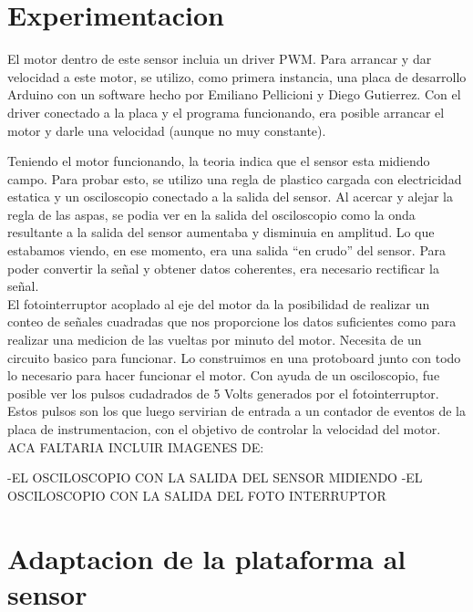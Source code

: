 
\section{Experimentacion} %
\label{sec:experimentacion}

El motor dentro de este sensor incluia un driver PWM. Para arrancar y dar velocidad a este motor, se utilizo, como primera instancia, una placa de desarrollo Arduino con un software hecho por Emiliano Pellicioni y Diego Gutierrez. Con el driver conectado a la placa y el programa funcionando, era posible arrancar el motor y darle una velocidad (aunque no muy constante).

Teniendo el motor funcionando, la teoria indica que el sensor esta midiendo campo. Para probar esto, se utilizo una regla de plastico cargada con electricidad estatica y un osciloscopio conectado a la salida del sensor. Al acercar y alejar la regla de las aspas, se podia ver en la salida del osciloscopio como la onda resultante a la salida del sensor aumentaba y disminuia en amplitud. Lo que estabamos viendo, en ese momento, era una salida ``en crudo'' del sensor. Para poder convertir la señal y obtener datos coherentes, era necesario rectificar la señal. \\

El fotointerruptor acoplado al eje del motor da la posibilidad de realizar un conteo de señales cuadradas que nos proporcione los datos suficientes como para realizar una medicion de las vueltas por minuto del motor. Necesita de un circuito basico para funcionar. Lo construimos en una protoboard junto con todo lo necesario para hacer funcionar el motor. Con ayuda de un osciloscopio, fue posible ver los pulsos cudadrados de 5 Volts generados por el fotointerruptor. Estos pulsos son los que luego servirian de entrada a un contador de eventos de la placa de instrumentacion, con el objetivo de controlar la velocidad del motor. \\

ACA FALTARIA INCLUIR IMAGENES DE:

-EL OSCILOSCOPIO CON LA SALIDA DEL SENSOR MIDIENDO
-EL OSCILOSCOPIO CON LA SALIDA DEL FOTO INTERRUPTOR


\section{Adaptacion de la plataforma al sensor} %
\label{sec:adaptacion_de_la_plataforma_al_sensor}

